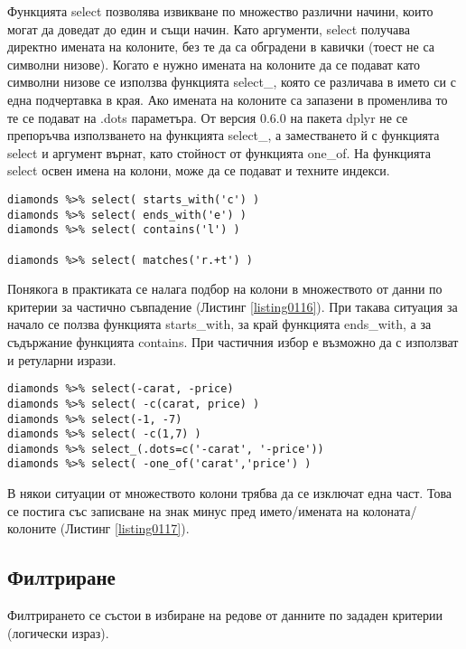 Функцията select позволява извикване по множество различни начини, които могат да доведат до един и същи начин. Като аргументи, select получава директно имената на колоните, без те да са обградени в кавички (тоест не са символни низове). Когато е нужно имената на колоните да се подават като символни низове се използва функцията select\_, която се различава в името си с една подчертавка в края. Ако имената на колоните са запазени в променлива то те се подават на .dots параметъра. От версия 0.6.0 на пакета dplyr не се препоръчва използването на функцията select\_, а заместването й с функцията select и аргумент върнат, като стойност от функцията one\_of. На функцията select освен имена на колони, може да се подават и техните индекси. 

\begin{lstlisting}[caption=Търсене по частично съвпадение, label=listing0116]
diamonds %>% select( starts_with('c') )
diamonds %>% select( ends_with('e') )
diamonds %>% select( contains('l') )

diamonds %>% select( matches('r.+t') )
\end{lstlisting}

Понякога в практиката се налага подбор на колони в множеството от данни по критерии за частично съвпадение (Листинг \ref{listing0116}). При такава ситуация за начало се ползва функцията starts\_with, за край функцията ends\_with, а за съдържание функцията contains. При частичния избор е възможно да с използват и ретуларни изрази. 

\begin{lstlisting}[caption=Изключване на колони, label=listing0117]
diamonds %>% select(-carat, -price)
diamonds %>% select( -c(carat, price) )
diamonds %>% select(-1, -7)
diamonds %>% select( -c(1,7) )
diamonds %>% select_(.dots=c('-carat', '-price'))
diamonds %>% select( -one_of('carat','price') )
\end{lstlisting}

В някои ситуации от множеството колони трябва да се изключат една част. Това се постига със записване на знак минус пред името/имената на колоната/колоните (Листинг \ref{listing0117}).

\subsection{Филтриране}

Филтрирането се състои в избиране на редове от данните по зададен критерии (логически израз). 

